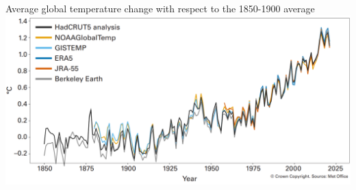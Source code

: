 \documentclass[9pt,handout,aspectratio=169]{beamer}
\begin{document}
\begin{frame}
\begin{scriptsize}
\begin{columns}
      \begin{center}
        {\scriptsize \cb Average global temperature change with respect to the 1850-1900 average}
          \includegraphics[width=1.0\textwidth]{plots/WMO_temperature}
      \end{center}
    \end{columns}

  \end{scriptsize}
  \end{frame}
\end{document}

